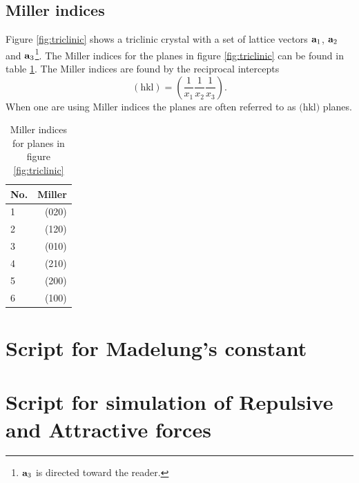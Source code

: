 \documentclass[10pt, a4paper]{amsart}
\begin{document}
\subsection{Miller indices}

Figure \ref{fig:triclinic} shows a triclinic crystal with a set of lattice vectors $\vb{a}_1$, $\vb{a}_2$ and $\vb{a}_3$\footnote{$\vb{a}_3$ is directed toward the reader.}. The Miller indices for the planes in figure \ref{fig:triclinic} can be found in table \ref{tab:miller}. The Miller indices are found by the reciprocal intercepts
\begin{equation}
(\text{hkl}) = \left(\frac{1}{x_1}\frac{1}{x_2}\frac{1}{x_3}\right).
\end{equation}
When one are using Miller indices the planes are often referred to as $($hkl$)$ planes.

\begin{table}
	\centering
	\caption{Miller indices for planes in figure \ref{fig:triclinic}}
	\label{tab:miller}
	\begin{tabular}{lr} 
	No. & Miller \\ \hline
	1 	& (020) \\
	2	& (120) \\
	3 	& (010) \\
	4	& (210) \\
	5	& (200) \\
	6 	& (100) \\ \hline
	\end{tabular}
\end{table}

\begin{appendices}

\section{Script for Madelung's constant}
\label{app:madelung}


\section{Script for simulation of Repulsive and Attractive forces}
\label{app:forces}


\end{appendices}
\end{document}
